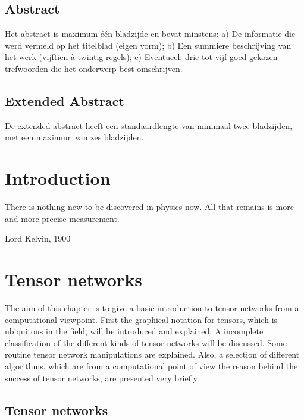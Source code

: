 \documentclass{book}
\begin{document}


\section*{Abstract}

Het abstract is maximum één bladzijde en bevat minstens:
a) De informatie die werd vermeld op het titelblad (eigen vorm);
b) Een summiere beschrijving van het werk (vijftien à twintig regels);
c) Eventueel: drie tot vijf goed gekozen trefwoorden die het onderwerp best
omschrijven.


\section*{Extended Abstract}

De extended abstract heeft een standaardlengte van minimaal twee bladzijden, met een maximum van zes bladzijden.

\tableofcontents

\listoffigures

\mainmatter

\chapter{Introduction}

\epigraph{There is nothing new to be discovered in physics now. All that remains is more and more precise measurement.}{Lord Kelvin, 1900}



\chapter{Tensor networks}

The aim of this chapter is to give a basic introduction to tensor networks from a computational viewpoint. First the graphical notation for tensors, which is ubiquitous in the field, will be introduced and explained. A incomplete classification of the different kinds of tensor networks will be discussed. Some routine tensor network manipulations are explained. Also, a selection of different algorithms, which are from a computational point of view the reason behind the success of tensor networks, are presented very briefly.

\section{Tensor networks}

\end{document}
